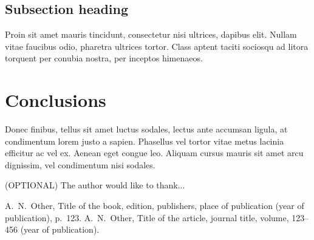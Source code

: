 \documentclass[12pt, onecolumn]{revtex4-2}    %
\begin{document}
\subsection{Subsection heading}

Proin sit amet mauris tincidunt, consectetur nisi ultrices, dapibus elit. Nullam vitae faucibus odio, pharetra ultrices tortor. Class aptent taciti sociosqu ad litora torquent per conubia nostra, per inceptos himenaeos.

\section{Conclusions}

Donec finibus, tellus sit amet luctus sodales, lectus ante accumsan ligula, at condimentum lorem justo a sapien. Phasellus vel tortor vitae metus lacinia efficitur ac vel ex. Aenean eget congue leo. Aliquam cursus mauris sit amet arcu dignissim, vel condimentum nisi sodales.

\begin{acknowledgments}
    (OPTIONAL) The author would like to thank...
\end{acknowledgments}

\begin{thebibliography}{}
     A.~N.~Other, Title of the book, edition, publishers, place of publication (year of publication), p.~123.  %
     A.~N.~Other, Title of the article, journal title, volume, 123--456 (year of publication).   %
\end{thebibliography}
\end{document}
